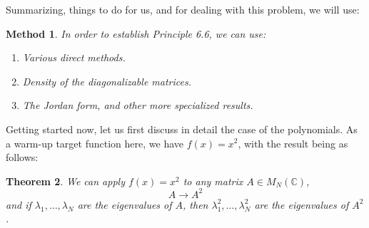 \documentclass[12pt]{amsbook}
\newtheorem{theorem}{Theorem}[chapter]
\newtheorem{method}[theorem]{Method}
\begin{document}
\bigskip

Summarizing, things to do for us, and for dealing with this problem, we will use:

\begin{method}
In order to establish Principle 6.6, we can use:
\begin{enumerate}
\item Various direct methods.

\item Density of the diagonalizable matrices.

\item The Jordan form, and other more specialized results.
\end{enumerate}
\end{method}

Getting started now, let us first discuss in detail the case of the polynomials. As a warm-up target function here, we have $f(x)=x^2$, with the result being as follows:

\begin{theorem}
We can apply $f(x)=x^2$ to any matrix $A\in M_N(\mathbb C)$, 
$$A\to A^2$$
and if $\lambda_1,\ldots,\lambda_N$ are the eigenvalues of $A$, then $\lambda_1^2,\ldots,\lambda_N^2$ are the eigenvalues of $A^2$.
\end{theorem}
\end{document}
